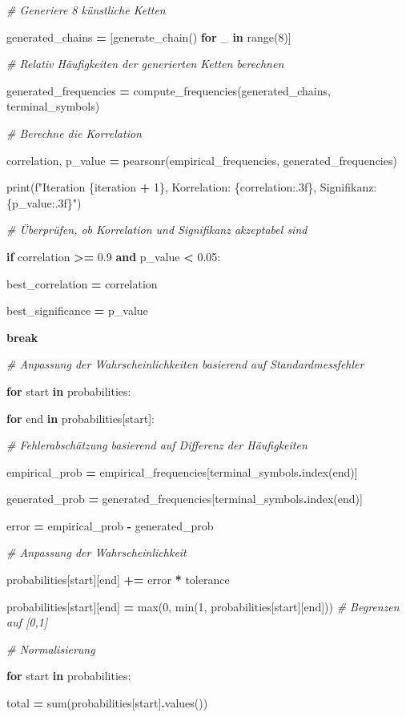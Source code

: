\documentclass[
]{article}
\begin{document}
\emph{\# Generiere 8 künstliche Ketten}

generated\_chains \textbf{=} {[}generate\_chain() \textbf{for} \_
\textbf{in} range(8){]}

\emph{\# Relativ Häufigkeiten der generierten Ketten berechnen}

generated\_frequencies \textbf{=}
compute\_frequencies(generated\_chains, terminal\_symbols)

\emph{\# Berechne die Korrelation}

correlation, p\_value \textbf{=} pearsonr(empirical\_frequencies,
generated\_frequencies)

print(f"Iteration \{iteration \textbf{+} 1\}, Korrelation:
\{correlation:.3f\}, Signifikanz: \{p\_value:.3f\}")

\emph{\# Überprüfen, ob Korrelation und Signifikanz akzeptabel sind}

\textbf{if} correlation \textbf{\textgreater=} 0.9 \textbf{and} p\_value
\textbf{\textless{}} 0.05:

best\_correlation \textbf{=} correlation

best\_significance \textbf{=} p\_value

\textbf{break}

\emph{\# Anpassung der Wahrscheinlichkeiten basierend auf
Standardmessfehler}

\textbf{for} start \textbf{in} probabilities:

\textbf{for} end \textbf{in} probabilities{[}start{]}:

\emph{\# Fehlerabschätzung basierend auf Differenz der Häufigkeiten}

empirical\_prob \textbf{=}
empirical\_frequencies{[}terminal\_symbols\textbf{.}index(end){]}

generated\_prob \textbf{=}
generated\_frequencies{[}terminal\_symbols\textbf{.}index(end){]}

error \textbf{=} empirical\_prob \textbf{-} generated\_prob

\emph{\# Anpassung der Wahrscheinlichkeit}

probabilities{[}start{]}{[}end{]} \textbf{+=} error \textbf{*} tolerance

probabilities{[}start{]}{[}end{]} \textbf{=} max(0, min(1,
probabilities{[}start{]}{[}end{]})) \emph{\# Begrenzen auf {[}0,1{]}}

\emph{\# Normalisierung}

\textbf{for} start \textbf{in} probabilities:

total \textbf{=} sum(probabilities{[}start{]}\textbf{.}values())
\end{document}
